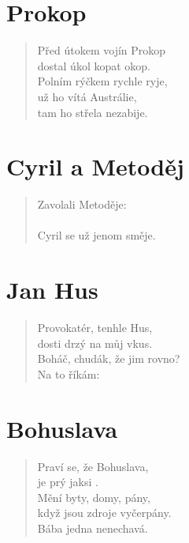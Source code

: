 \section*{Prokop}
\begin{verse}
Před útokem vojín Prokop\\
dostal úkol kopat okop.\\
Polním rýčkem rychle ryje,\\
už ho vítá Austrálie,\\
tam ho střela nezabije.
\end{verse}

\section*{Cyril a Metoděj}
\begin{verse}
Zavolali Metoděje:\\
\\
Cyril se už jenom směje.
\end{verse}

\section*{Jan Hus}
\begin{verse}
Provokatér, tenhle Hus,\\
dosti drzý na můj vkus.\\
Boháč, chudák, že jim rovno?\\
Na to říkám: 
\end{verse}

\section*{Bohuslava}
\begin{verse}
Praví se, že Bohuslava,\\
je prý jaksi .\\
Mění byty, domy, pány,\\
když jsou zdroje vyčerpány.\\
Bába jedna nenechavá.
\end{verse}


